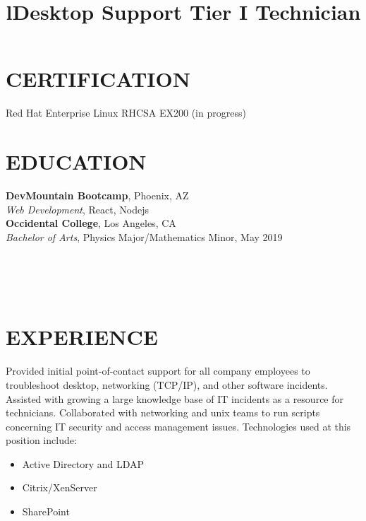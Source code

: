 \documentclass[margin]{res}
\begin{document}
\begin{resume}

	\section{CERTIFICATION}
	Red Hat Enterprise Linux RHCSA EX200 (in progress)

\section{EDUCATION}
\textbf{DevMountain Bootcamp}, Phoenix, AZ\\
{\sl Web Development}, React, Nodejs\\
\textbf{Occidental College}, Los Angeles, CA\\
{\sl Bachelor of Arts}, Physics Major/Mathematics Minor, May 2019\hfill 


\begin{format}
\title{l}\\
\\
\body\\
\end{format}

\section{EXPERIENCE}
\title{\textbf{Desktop Support Tier I Technician}}
\begin{position}
	Provided initial point-of-contact support for all company employees to troubleshoot desktop, networking (TCP/IP), and other software incidents. Assisted with growing a large knowledge base of IT incidents as a resource for technicians. Collaborated with networking and unix teams to run scripts concerning IT security and access management issues. Technologies used at this position include:
	\begin{itemize}
		\item Active Directory and LDAP
		\item Citrix/XenServer
		\item SharePoint
	\end{itemize}
\end{position}


\end{resume}
\end{document}
